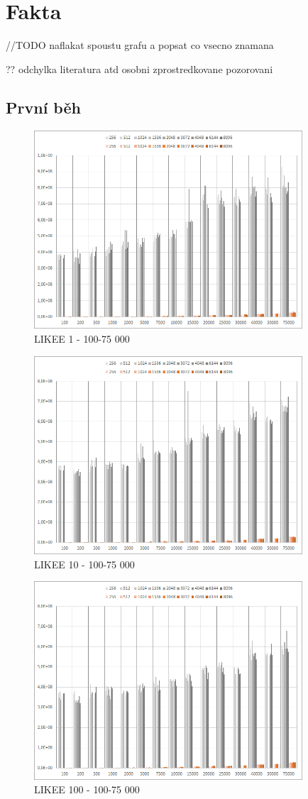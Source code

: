 \documentclass[a4paper, 11pt]{article}
\begin{document}
\section{Fakta}
//TODO naflakat spoustu grafu a popsat co vsecno znamana

?? odchylka
literatura atd 
osobni zprostredkovane pozorovani

\subsection{První běh}
\newpage
\begin{figure}[H]
\centering
\includegraphics[width=100mm]{images/f1-100-75k.png}
\caption{LIKEE 1 - 100-75 000}
\end{figure}
\begin{figure}[H]
\centering
\includegraphics[width=100mm]{images/f10-100-75k.png}
\caption{LIKEE 10 - 100-75 000}
\end{figure}
\begin{figure}[H]
\centering
\includegraphics[width=100mm]{images/f100-100-75k.png}
\caption{LIKEE 100 - 100-75 000}
\end{figure}
\end{document}
